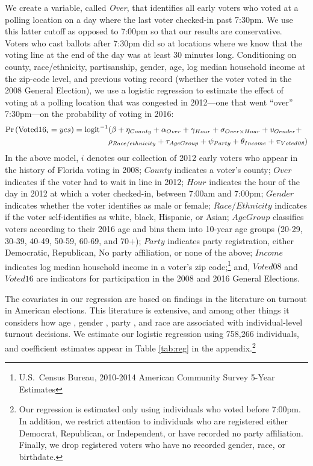 \documentclass[12pt,titlepage]{article}
\begin{document}
We create a variable, called \emph{Over}, that identifies all early
voters who voted at a polling location on a day where the last voter
checked-in past 7:30pm.  We use this latter cutoff as opposed to
7:00pm so that our results are conservative.  Voters who cast ballots
after 7:30pm did so at locations where we know that the voting line at
the end of the day was at least 30 minutes long.  Conditioning on
county, race/ethnicity, partisanship, gender, age, log median
household income at the zip-code level, and previous voting record
(whether the voter voted in the 2008 General Election), we use a
logistic regression to estimate the effect of voting at a polling
location that was congested in 2012---one that went ``over''
7:30pm---on the probability of voting in 2016:
\begin{equation*}
  \begin{aligned}
    \textup{Pr}\left(\mathrm{Voted16}_{i} = yes\right) =
    \textup{logit}^{-1}&(\beta + \eta_{County} + \alpha_{Over} + \gamma_{Hour} +
    \sigma_{Over \times Hour} + \upsilon_{Gender}  + \\& \rho_{Race/ethnicity} +
      \tau_{Age Group} + \psi_{Party} + \theta_{Income} + \pi_{Voted\emph{08}})
  \end{aligned}  
\end{equation*}
%
In the above model, $i$ denotes our collection of 2012 early voters
who appear in the history of Florida voting in 2008; $County$
indicates a voter's county; $Over$ indicates if the voter had to wait
in line in 2012; $Hour$ indicates the hour of the day in 2012 at which
a voter checked-in, between 7:00am and 7:00pm; $Gender$ indicates
whether the voter identifies as male or female; $Race/Ethnicity$
indicates if the voter self-identifies as white, black, Hispanic, or
Asian; $Age Group$ classifies voters according to their 2016 age and
bins them into 10-year age groups (20-29, 30-39, 40-49, 50-59, 60-69,
and 70+); $Party$ indicates party registration, either Democratic,
Republican, No party affiliation, or none of the above; $Income$
indicates log median household income in a voter's zip
code;\footnote{U.S.\ Census Bureau, 2010-2014 American Community
  Survey 5-Year Estimates} and, $Voted08$ and $Voted16$ are indicators
for participation in the 2008 and 2016 General Elections.

The covariates in our regression are based on findings in the
literature on turnout in American elections.  This literature is
extensive, and among other things it considers how age
\citep{strateetal:age,hightonwolfinger:lifecycle}, gender
\citep{schlozman:genderdifferentvoice}, party
\citep{martinezgill:partisanturnout,grofmanetal:turnout}, and race
\citep{verbaetal:raceparticipation,fraga:raceturnout} are associated
with individual-level turnout decisions.  We estimate our logistic
regression using 758,266 individuals, and coefficient estimates appear
in Table \ref{tab:reg} in the appendix.\footnote{Our regression is
  estimated only using individuals who voted before 7:00pm.  In
  addition, we restrict attention to individuals who are registered
  either Democrat, Republican, or Independent, or have recorded no
  party affiliation.  Finally, we drop registered voters who have no
  recorded gender, race, or birthdate.}
\end{document}
